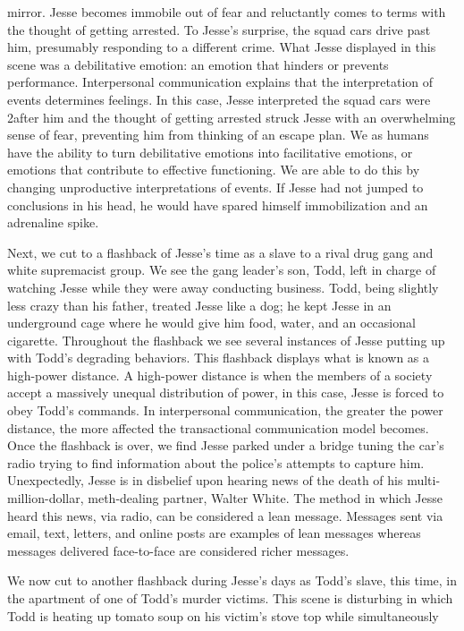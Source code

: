 \documentclass[12pt]{article}
\begin{document}
mirror. Jesse becomes immobile out of fear and reluctantly comes to terms
with the thought of getting arrested. To Jesse’s surprise, the squad cars drive
past him, presumably responding to a different crime. What Jesse displayed
in this scene was a debilitative emotion: an emotion that hinders or prevents
performance. Interpersonal communication explains that the interpretation of
events determines feelings. In this case, Jesse interpreted the squad cars were
2after him and the thought of getting arrested struck Jesse with an overwhelming
sense of fear, preventing him from thinking of an escape plan. We as humans have
the ability to turn debilitative emotions into facilitative emotions, or emotions
that contribute to effective functioning. We are able to do this by changing
unproductive interpretations of events. If Jesse had not jumped to conclusions in
his head, he would have spared himself immobilization and an adrenaline spike.
\par
Next, we cut to a flashback of Jesse’s time as a slave to a rival drug gang and
white supremacist group. We see the gang leader’s son, Todd, left in charge
of watching Jesse while they were away conducting business. Todd, being
slightly less crazy than his father, treated Jesse like a dog; he kept Jesse in
an underground cage where he would give him food, water, and an occasional
cigarette. Throughout the flashback we see several instances of Jesse putting up
with Todd’s degrading behaviors. This flashback displays what is known as a
high-power distance. A high-power distance is when the members of a society
accept a massively unequal distribution of power, in this case, Jesse is forced to
obey Todd’s commands. In interpersonal communication, the greater the power
distance, the more affected the transactional communication model becomes.
Once the flashback is over, we find Jesse parked under a bridge tuning the
car’s radio trying to find information about the police’s attempts to capture
him. Unexpectedly, Jesse is in disbelief upon hearing news of the death of his
multi-million-dollar, meth-dealing partner, Walter White. The method in which
Jesse heard this news, via radio, can be considered a lean message. Messages
sent via email, text, letters, and online posts are examples of lean messages
whereas messages delivered face-to-face are considered richer messages.
\par
We now cut to another flashback during Jesse’s days as Todd’s slave, this time, in
the apartment of one of Todd’s murder victims. This scene is disturbing in which
Todd is heating up tomato soup on his victim’s stove top while simultaneously
\end{document}

